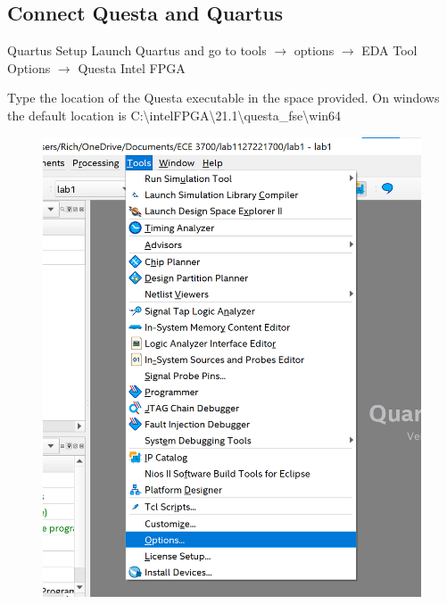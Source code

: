 \documentclass[fleqn]{beamer}
\begin{document}
\subsection{Connect Questa and Quartus}
\begin{frame}{Quartus Setup}
    Launch Quartus and go to tools $\longrightarrow$ options $\longrightarrow$ EDA Tool Options $\longrightarrow$ Questa Intel FPGA\par
    Type the location of the Questa executable in the space provided. On windows the default location is C:\textbackslash{}intelFPGA\textbackslash{}21.1\textbackslash{}questa\_fse\textbackslash{}win64
    \begin{multicols}{2}
        \begin{figure}
        \centering
        \includegraphics[scale=.3]{figures/quartusopts.png}
        \label{fig:my_label}
    \end{figure}
    \begin{figure}
        \centering

\end{figure}
\end{multicols}
\end{frame}
\end{document}
